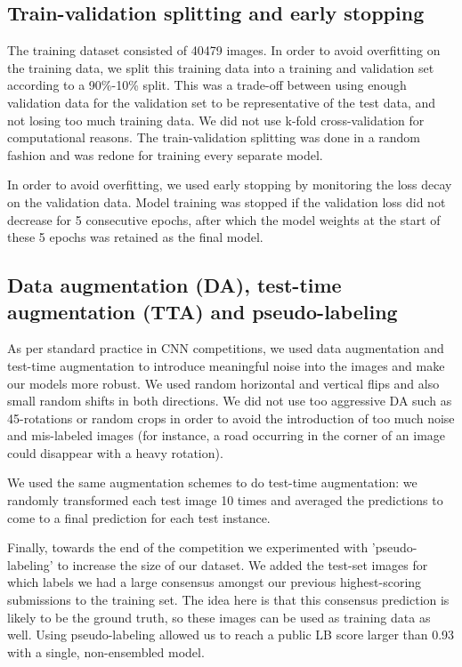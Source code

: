 \documentclass[fleqn]{homework}
\begin{document}
\subsection*{Train-validation splitting and early stopping}
The training dataset consisted of 40479 images. In order to avoid overfitting on the training data, we split this training data into a training and validation set according to a 90\%-10\% split. This was a trade-off between using enough validation data for the validation set to be representative of the test data, and not losing too much training data. We did not use k-fold cross-validation for computational reasons. The train-validation splitting was done in a random fashion and was redone for training every separate model.

In order to avoid overfitting, we used early stopping by monitoring the loss decay on the validation data. Model training was stopped if the validation loss did not decrease for 5 consecutive epochs, after which the model weights at the start of these 5 epochs was retained as the final model. 

\subsection*{Data augmentation (DA), test-time augmentation (TTA) and pseudo-labeling}

As per standard practice in CNN competitions, we used data augmentation and test-time augmentation to introduce meaningful noise into the images and make our models more robust. We used random horizontal and vertical flips and also small random shifts in both directions. We did not use too aggressive DA such as 45\degree -rotations or random crops in order to avoid the introduction of too much noise and mis-labeled images (for instance, a road occurring in the corner of an image could disappear with a heavy rotation). 

We used the same augmentation schemes to do test-time augmentation: we randomly transformed each test image 10 times and averaged the predictions to come to a final prediction for each test instance. 

Finally, towards the end of the competition we experimented with 'pseudo-labeling' to increase the size of our dataset. We added the test-set images for which labels we had a large consensus amongst our previous highest-scoring submissions to the training set. The idea here is that this consensus prediction is likely to be the ground truth, so these images can be used as training data as well. Using pseudo-labeling allowed us to reach a public LB score larger than 0.93 with a single, non-ensembled model.
\end{document}
